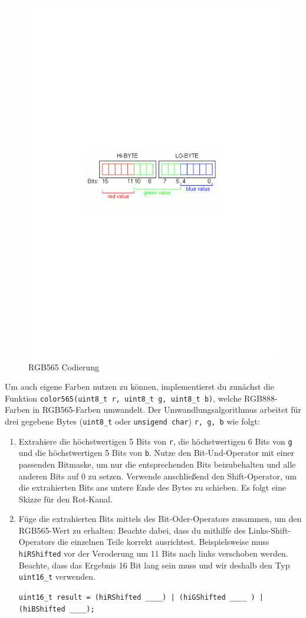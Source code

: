 \begin{figure}[!htb]
    \begin{centering}
        \includegraphics[width=.5\textwidth]{./05_c/figures/rgb565}
        \caption{RGB565 Codierung}
        \label{fig:rgb565}
    \end{centering}
\end{figure}
%
Um auch eigene Farben nutzen zu können, implementierst du zunächst die Funktion \lstinline|color565(uint8_t r, uint8_t g, uint8_t b)|, welche RGB888-Farben in RGB565-Farben umwandelt.
Der Umwandlungsalgorithmus arbeitet für drei gegebene Bytes (\lstinline|uint8_t| oder \lstinline|unsigend char|) \lstinline|r, g, b| wie folgt:
\begin{enumerate}
\item 
Extrahiere die höchstwertigen 5 Bits von \lstinline|r|, die höchstwertigen 6 Bits von \lstinline|g| und die höchstwertigen 5 Bits von \lstinline|b|.
Nutze den Bit-Und-Operator mit einer passenden Bitmaske, um nur die entsprechenden Bits beizubehalten und alle anderen Bits auf 0 zu setzen.
Verwende anschließend den Shift-Operator, um die extrahierten Bits ans untere Ende des Bytes zu schieben.
Es folgt eine Skizze für den Rot-Kanal.


\item 
Füge die extrahierten Bits mittels des Bit-Oder-Operators zusammen, um den RGB565-Wert zu erhalten:
Beachte dabei, dass du mithilfe des Links-Shift-Operators die einzelnen Teile korrekt ausrichtest.
Beispielsweise muss \lstinline|hiRShifted| vor der Veroderung um 11 Bits nach links verschoben werden.
Beachte, dass das Ergebnis 16 Bit lang sein muss und wir deshalb den Typ \lstinline|uint16_t| verwenden.

\lstinline$uint16_t result = (hiRShifted ____) | (hiGShifted ____ ) | (hiBShifted ____);$
\end{enumerate}

